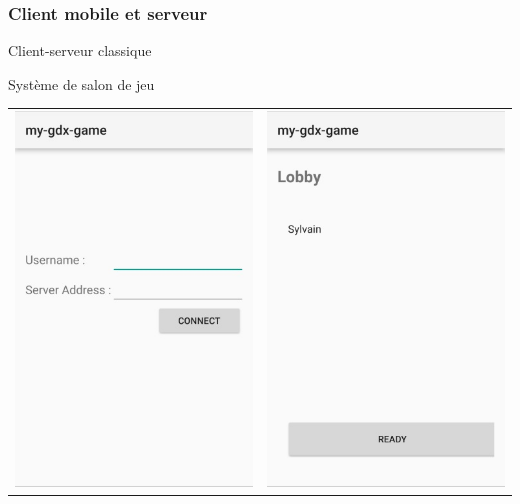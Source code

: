\begin{frame}
\frametitle{Client mobile et serveur}
\begin{center}
Client-serveur classique

Système de salon de jeu

\begin{tabular}{cc}
\includegraphics[scale=0.3]{images/jeu1.jpg} & \includegraphics[scale=0.3]{images/jeu2.jpg} \\

\end{tabular}
\end{center}
\end{frame}
